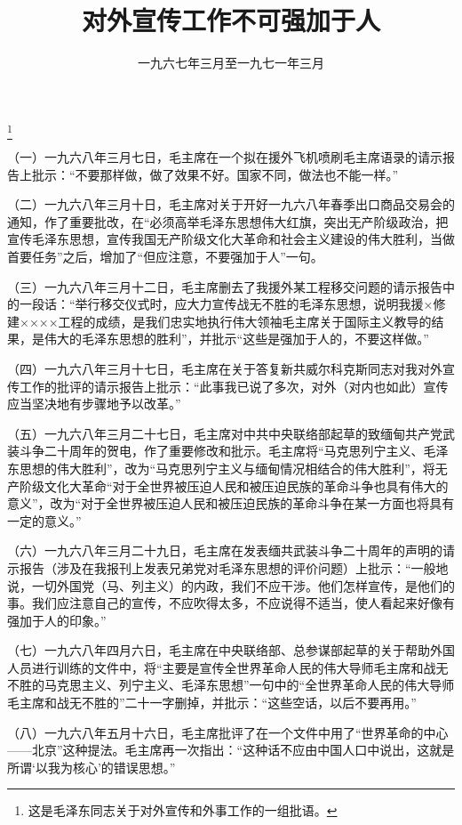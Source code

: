 
\title{对外宣传工作不可强加于人}
\date{一九六七年三月至一九七一年三月}
\thanks{这是毛泽东同志关于对外宣传和外事工作的一组批语。}
\maketitle


（一）一九六八年三月七日，毛主席在一个拟在援外飞机喷刷毛主席语录的请示报告上批示：“不要那样做，做了效果不好。国家不同，做法也不能一样。”

（二）一九六八年三月十日，毛主席对关于开好一九六八年春季出口商品交易会的通知，作了重要批改，在“必须高举毛泽东思想伟大红旗，突出无产阶级政治，把宣传毛泽东思想，宣传我国无产阶级文化大革命和社会主义建设的伟大胜利，当做首要任务”之后，增加了“但应注意，不要强加于人”一句。

（三）一九六八年三月十二日，毛主席删去了我援外某工程移交问题的请示报告中的一段话：“举行移交仪式时，应大力宣传战无不胜的毛泽东思想，说明我援×修建××××工程的成绩，是我们忠实地执行伟大领袖毛主席关于国际主义教导的结果，是伟大的毛泽东思想的胜利”，并批示“这些是强加于人的，不要这样做。”

（四）一九六八年三月十七日，毛主席在关于答复新共威尔科克斯同志对我对外宣传工作的批评的请示报告上批示：“此事我已说了多次，对外（对内也如此）宣传应当坚决地有步骤地予以改革。”

（五）一九六八年三月二十七日，毛主席对中共中央联络部起草的致缅甸共产党武装斗争二十周年的贺电，作了重要修改和批示。毛主席将“马克思列宁主义、毛泽东思想的伟大胜利”，改为“马克思列宁主义与缅甸情况相结合的伟大胜利”，将无产阶级文化大革命“对于全世界被压迫人民和被压迫民族的革命斗争也具有伟大的意义”，改为“对于全世界被压迫人民和被压迫民族的革命斗争在某一方面也将具有一定的意义。”

（六）一九六八年三月二十九日，毛主席在发表缅共武装斗争二十周年的声明的请示报告（涉及在我报刊上发表兄弟党对毛泽东思想的评价问题）上批示：“一般地说，一切外国党（马、列主义）的内政，我们不应干涉。他们怎样宣传，是他们的事。我们应注意自己的宣传，不应吹得太多，不应说得不适当，使人看起来好像有强加于人的印象。”

（七）一九六八年四月六日，毛主席在中央联络部、总参谋部起草的关于帮助外国人员进行训练的文件中，将“主要是宣传全世界革命人民的伟大导师毛主席和战无不胜的马克思主义、列宁主义、毛泽东思想”一句中的“全世界革命人民的伟大导师毛主席和战无不胜的”二十一字删掉，并批示：“这些空话，以后不要再用。”

（八）一九六八年五月十六日，毛主席批评了在一个文件中用了“世界革命的中心——北京”这种提法。毛主席再一次指出：“这种话不应由中国人口中说出，这就是所谓‘以我为核心’的错误思想。”

